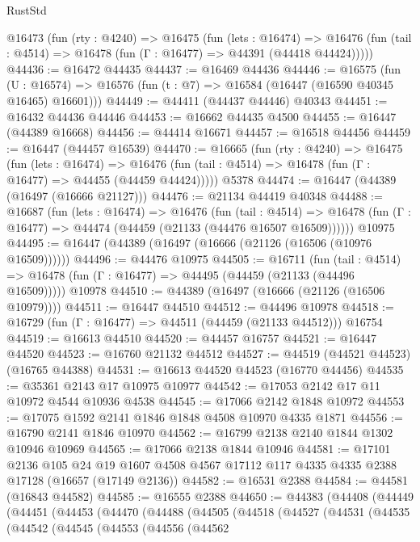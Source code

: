 \begin{lexlean}{RustStd}
\begin{coremodule}
  @16473
    (fun (rty : @4240) =>
    @16475
      (fun (lets : @16474) =>
      @16476 (fun (tail : @4514) => @16478 (fun (Γ : @16477) => @44391 (@44418 @44424)))))
@44436 := @16472 @44435
@44437 := @16469 @44436
@44446 := @16575
    (fun (U : @16574) => @16576 (fun (t : @7) => @16584 (@16447 (@16590 @40345 @16465) @16601)))
@44449 := @44411 (@44437 @44446) @40343
@44451 := @16432 @44436 @44446
@44453 := @16662 @44435 @4500
@44455 := @16447 (@44389 @16668)
@44456 := @44414 @16671
@44457 := @16518 @44456
@44459 := @16447 (@44457 @16539)
@44470 := @16665
    (fun (rty : @4240) =>
    @16475
      (fun (lets : @16474) =>
      @16476 (fun (tail : @4514) => @16478 (fun (Γ : @16477) => @44455 (@44459 @44424)))))
    @5378
@44474 := @16447 (@44389 (@16497 (@16666 @21127)))
@44476 := @21134 @44419 @40348
@44488 := @16687
    (fun (lets : @16474) =>
    @16476
      (fun (tail : @4514) =>
      @16478 (fun (Γ : @16477) => @44474 (@44459 (@21133 (@44476 @16507 @16509))))))
    @10975
@44495 := @16447 (@44389 (@16497 (@16666 (@21126 (@16506 (@10976 @16509))))))
@44496 := @44476 @10975
@44505 := @16711
    (fun (tail : @4514) => @16478 (fun (Γ : @16477) => @44495 (@44459 (@21133 (@44496 @16509)))))
    @10978
@44510 := @44389 (@16497 (@16666 (@21126 (@16506 @10979))))
@44511 := @16447 @44510
@44512 := @44496 @10978
@44518 := @16729 (fun (Γ : @16477) => @44511 (@44459 (@21133 @44512))) @16754
@44519 := @16613 @44510
@44520 := @44457 @16757
@44521 := @16447 @44520
@44523 := @16760 @21132 @44512
@44527 := @44519 (@44521 @44523) (@16765 @44388)
@44531 := @16613 @44520 @44523 (@16770 @44456)
@44535 := @35361 @2143 @17 @10975 @10977
@44542 := @17053 @2142 @17 @11 @10972 @4544 @10936 @4538
@44545 := @17066 @2142 @1848 @10972
@44553 := @17075 @1592 @2141 @1846 @1848 @4508 @10970 @4335 @1871
@44556 := @16790 @2141 @1846 @10970
@44562 := @16799 @2138 @2140 @1844 @1302 @10946 @10969
@44565 := @17066 @2138 @1844 @10946
@44581 := @17101
    @2136
    @105
    @24
    @19
    @1607
    @4508
    @4567
    @17112
    @117
    @4335
    @4335
    @2388
    @17128
    (@16657 (@17149 @2136))
@44582 := @16531 @2388
@44584 := @44581 (@16843 @44582)
@44585 := @16555 @2388
@44650 := @44383
    (@44408
      (@44449
        (@44451
          (@44453
            (@44470
              (@44488
                (@44505
                  (@44518
                    (@44527
                      (@44531
                        (@44535
                          (@44542
                            (@44545
                              (@44553
                                (@44556
                                  (@44562

\end{coremodule}
\end{lexlean}
